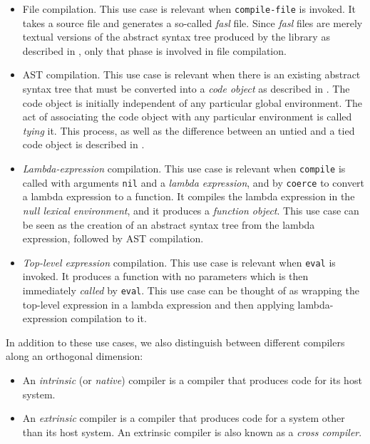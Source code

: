 \begin{itemize}
\item File compilation.  This use case is relevant when
  \texttt{compile-file} is invoked.  It takes a \commonlisp{} source
  file and generates a so-called \emph{fasl} file.  Since \sysname{}
  \emph{fasl} files are merely textual versions of the abstract syntax
  tree produced by the \iconoclast{} library as described in
  , only that phase is involved in file
  compilation.

\item AST compilation.  This use case is relevant when there is an
  existing abstract syntax tree that must be converted into a
  \emph{code object} as described in
  .  The code object is
  initially independent of any particular global environment.  The act
  of associating the code object with any particular environment is
  called \emph{tying} it.  This process, as well as the difference
  between an untied and a tied code object is described in
  .

\item \emph{Lambda-expression} compilation.  This use case is relevant
  when \texttt{compile} is called with arguments \texttt{nil} and a
  \emph{lambda expression}, and by \texttt{coerce} to convert a lambda
  expression to a function.  It compiles the lambda expression in the
  \emph{null lexical environment}, and it produces a \emph{function
    object}.  This use case can be seen as the creation of an abstract
  syntax tree from the lambda expression, followed by AST compilation.

\item \emph{Top-level expression} compilation.  This use case is
  relevant when \texttt{eval} is invoked.  It produces a function with
  no parameters which is then immediately \emph{called} by
  \texttt{eval}.  This use case can be thought of as wrapping the
  top-level expression in a lambda expression and then applying
  lambda-expression compilation to it.

\end{itemize}

In addition to these use cases, we also distinguish between different
compilers along an orthogonal dimension:

\begin{itemize}
\item An \emph{intrinsic} (or \emph{native}) compiler is a compiler
  that produces code for its host \commonlisp{} system.
\item An \emph{extrinsic} compiler is a compiler that produces code
  for a \commonlisp{} system other than its host system.  An extrinsic
  compiler is also known as a \emph{cross compiler}.
\end{itemize}

